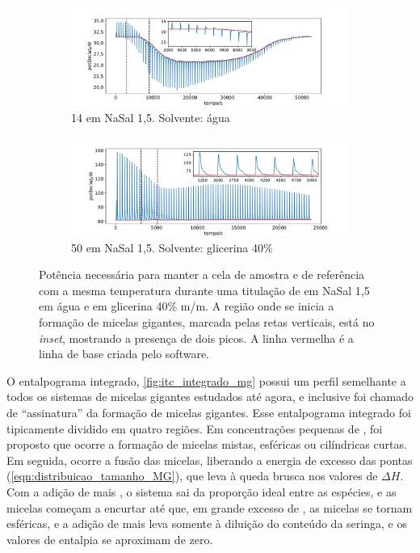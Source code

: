 		\begin{figure}
			\begin{subfigure}{\textwidth}
				\centering
				\includegraphics[width=\textwidth]{imagens/itc/exemplo_raw_mg}
				\caption{\TTAB{} 14 \mM em NaSal 1,5\mM. Solvente: água}
				\label{fig:itc_raw_mg}
			\end{subfigure}
		
			\begin{subfigure}{\textwidth}
				\centering
				\includegraphics[width=\textwidth]{imagens/itc/raw_itc_glicerina}
				\caption{\TTAB{} 50 \mM em NaSal 1,5\mM. Solvente: glicerina 40\%}
				\label{fig:raw_itc_mg_glicerina}
			\end{subfigure}
			
			\caption{Potência necessária para manter a cela de amostra e de referência com a mesma temperatura durante uma titulação de \TTAB{} em NaSal 1,5 \mM{} em água e em glicerina 40\% m/m. A região onde se inicia a formação de micelas gigantes, marcada pelas retas verticais, está no \emph{inset}, mostrando a presença de dois picos. A linha vermelha é a linha de base criada pelo software.}
			\label{fig:itc_raw_agua_glicerina}
		\end{figure}
	
		O entalpograma integrado, \autoref{fig:itc_integrado_mg} possui um perfil semelhante a todos os sistemas de micelas gigantes estudados até agora, e inclusive foi chamado de ``assinatura'' da formação de micelas gigantes. \cite{Ito2016}
		Esse entalpograma integrado foi tipicamente dividido em quatro regiões. Em concentrações pequenas de \TTAB, foi proposto que ocorre a formação de micelas mistas, esféricas ou cilíndricas curtas. Em seguida, ocorre a fusão das micelas, liberando a energia de excesso das pontas (\autoref{eqn:distribuicao_tamanho_MG}), que leva à queda brusca nos valores de \(\Delta H\). Com a adição de mais \TTAB, o sistema sai da proporção ideal entre as espécies, e as micelas começam a encurtar até que, em grande excesso de \TTAB, as micelas se tornam esféricas, e a adição de mais \TTAB{} leva somente à diluição do conteúdo da seringa, e os valores de entalpia se aproximam de zero.\cite{Shukla2008, Ito2015c}
		

